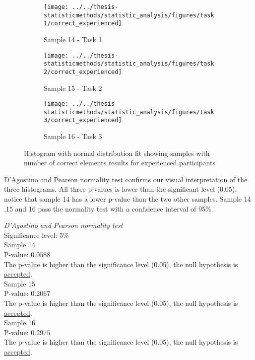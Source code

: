 \begin{figure}[H]
	\centering
	\begin{subfigure}[b]{0.32\textwidth}
		\centering
		\texttt{[image: ../../thesis-statisticmethods/statistic\_analysis/figures/task1/correct\_experienced]}
		\caption{Sample 14 - Task 1}
		\label{fig:correctexperienced_task1}
	\end{subfigure}
	\begin{subfigure}[b]{0.32\textwidth}
		\centering
		\texttt{[image: ../../thesis-statisticmethods/statistic\_analysis/figures/task2/correct\_experienced]}
		\caption{Sample 15 - Task 2}
		\label{fig:correctexperienced_task2}
	\end{subfigure}
	\begin{subfigure}[b]{0.32\textwidth}
		\centering
		\texttt{[image: ../../thesis-statisticmethods/statistic\_analysis/figures/task3/correct\_experienced]}
		\caption{Sample 16 - Task 3}
		\label{fig:correctexperienced_task3}
	\end{subfigure}
	\caption{Histogram with normal distribution fit showing samples with number of correct elements results for experienced participants}
	\label{fig:sample14,15,16_normhistogram}
\end{figure}

  D'Agostino and Pearson normality test confirms our visual interpretation of the three histograms. All three p-values is lower than the significant level (0.05), notice that sample 14 has a lower p-value than the two other samples. Sample 14 ,15 and 16 pass the normality test with a confidence interval of 95\%. 

  \begin{center}
	\begin{tcolorbox}[box align=center,width=\textwidth-5cm]
		\centering
		\textit{D'Agostino and Pearson normality test}\\
		Significance level: 5\%  \\[0.5cm]
		
		Sample 14 \\
		P-value: $0.0588$\\
		The p-value is higher than the significance level (0.05), the null hypothesis is \underline{accepted}.\\[0.5cm]
		
		Sample 15 \\
		P-value: $0.2067$ \\
		The p-value is higher than the significance level (0.05), the null hypothesis is \underline{accepted}.\\[0.5cm]
		
		Sample 16 \\
		P-value: $0.2975$ \\
		The p-value is higher than the significance level (0.05), the null hypothesis is \underline{accepted}.\\[0.5cm]
	\end{tcolorbox}
\end{center}

